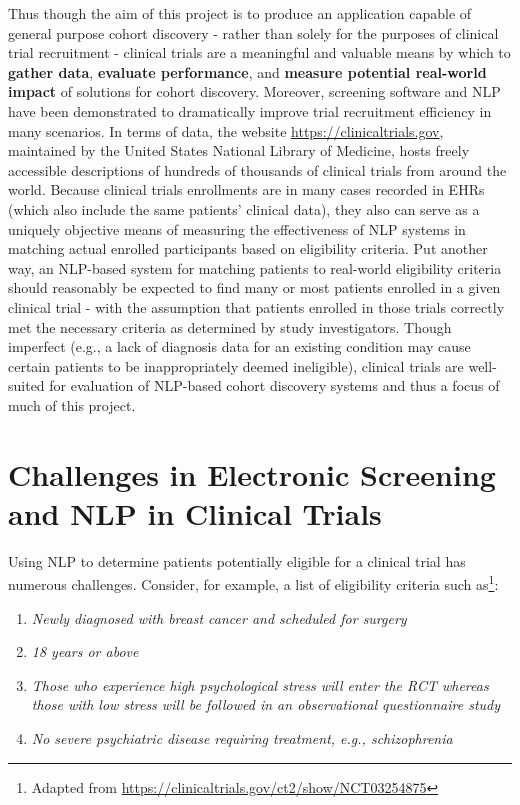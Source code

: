 \documentclass[../main.tex]{subfiles}
\begin{document}
Thus though the aim of this project is to produce an application capable of general purpose cohort discovery - rather than solely for the purposes of clinical trial recruitment - clinical trials are a meaningful and valuable means by which to \textbf{gather data}, \textbf{evaluate performance}, and \textbf{measure potential real-world impact} of solutions for cohort discovery. Moreover, screening software and NLP have been demonstrated to dramatically improve trial recruitment efficiency in many scenarios.
In terms of data, the website \url{https://clinicaltrials.gov}, maintained by the United States National Library of Medicine, hosts freely accessible descriptions of hundreds of thousands of clinical trials from around the world. Because clinical trials enrollments are in many cases recorded in EHRs (which also include the same patients' clinical data), they also can serve as a uniquely objective means of measuring the effectiveness of NLP systems in matching actual enrolled participants based on eligibility criteria. Put another way, an NLP-based system for matching patients to real-world eligibility criteria should reasonably be expected to find many or most patients enrolled in a given clinical trial - with the assumption that patients enrolled in those trials correctly met the necessary criteria as determined by study investigators. Though imperfect (e.g., a lack of diagnosis data for an existing condition may cause certain patients to be inappropriately deemed ineligible), clinical trials are well-suited for evaluation of NLP-based cohort discovery systems and thus a focus of much of this project.

\section{Challenges in Electronic Screening and NLP in Clinical Trials}

Using NLP to determine patients potentially eligible for a clinical trial has numerous challenges. Consider, for example, a list of eligibility criteria such as\footnote{Adapted from  \url{https://clinicaltrials.gov/ct2/show/NCT03254875}}:

\begin{enumerate}
    \itemsep0em 
    \item \textit{Newly diagnosed with breast cancer and scheduled for surgery}
    \item \textit{18 years or above}
    \item \textit{Those who experience high psychological stress will enter the RCT whereas those with low stress will be followed in an observational questionnaire study}
    \item \textit{No severe psychiatric disease requiring treatment, e.g., schizophrenia}
\end{enumerate}
\end{document}
